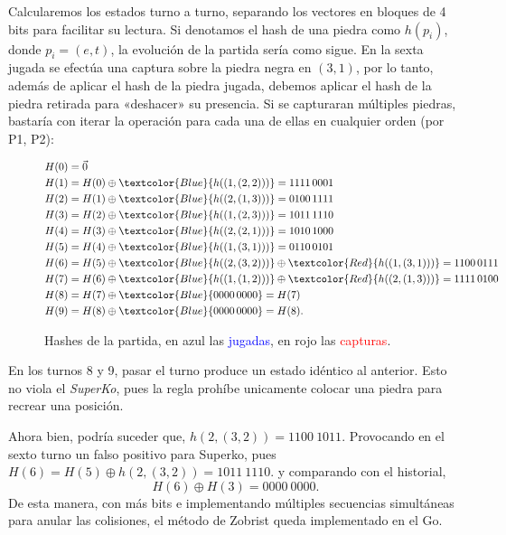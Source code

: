 Calcularemos los estados turno a turno, separando los vectores en bloques de 4 bits para facilitar su lectura. Si denotamos el hash de una piedra como $h(p_i)$, donde $p_i = (e, t)$, la evolución de la partida sería como sigue. En la sexta jugada se efectúa una captura sobre la piedra negra en $(3,1)$, por lo tanto, además de aplicar el hash de la piedra jugada, debemos aplicar el hash de la piedra retirada para «deshacer» su presencia. Si se capturaran múltiples piedras, bastaría con iterar la operación para cada una de ellas en cualquier orden (por P1, P2):
\begin{figure}[H]
	\centering
	\begin{align*}
		H(0) &= \vec{0} \\
		H(1) &= H(0) \oplus \textcolor{Blue}{h((1, (2,2)))} = 1111\, 0001 \\
		H(2) &= H(1) \oplus \textcolor{Blue}{h((2, (1,3)))} = 0100\, 1111 \\
		H(3) &= H(2) \oplus \textcolor{Blue}{h((1, (2,3)))}= 1011\, 1110 \\
		H(4) &= H(3) \oplus \textcolor{Blue}{h((2, (2,1)))} = 1010\, 1000 \\
		H(5) &= H(4) \oplus \textcolor{Blue}{h((1, (3,1))) }= 0110\, 0101 \\
		H(6) &= H(5) \oplus \textcolor{Blue}{h((2, (3,2)))} \oplus \textcolor{Red}{h((1, (3,1)))} = 1100\, 0111 \\
		H(7)  &= H(6) \oplus \textcolor{Blue}{h((1, (1,2)))} \oplus \textcolor{Red}{h((2, (1,3)))}= 1111\, 0100 \\
		H(8)  &= H(7) \oplus \textcolor{Blue}{0000\, 0000} = H(7) \\
		H(9)  &= H(8) \oplus  \textcolor{Blue}{0000\, 0000} = H(8).
	\end{align*}
	\caption{Hashes de la partida, en azul las \textcolor{Blue}{jugadas}, en rojo las \textcolor{Red}{capturas}.}
\end{figure} 
En los turnos 8 y 9, pasar el turno produce un estado idéntico al anterior. Esto no viola el \textit{SuperKo}, pues la regla prohíbe unicamente colocar una piedra para recrear una posición.

Ahora bien, podría suceder que, $h(2,(3,2))=1100\ 1011$. Provocando en el sexto turno un falso positivo para Superko, pues $H(6)= H(5)\oplus h(2,(3,2)) = 1011\ 1110.$ y comparando con el historial, $$H(6)\oplus H(3)=0000\ 0000.$$
De esta manera, con más bits e implementando múltiples secuencias simultáneas para anular las colisiones, el método de Zobrist queda implementado en el Go.

